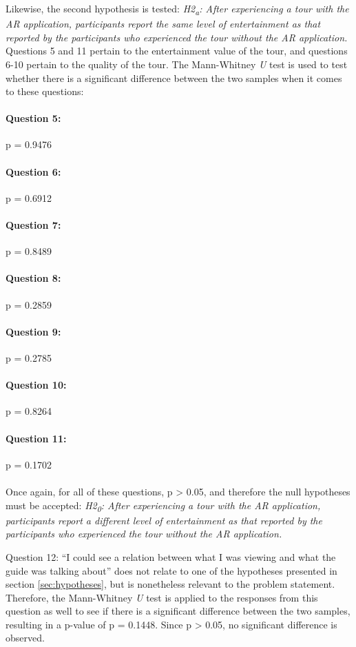 Likewise, the second hypothesis is tested: \textit{H2\textsubscript{a}: After experiencing a tour with the AR application, participants report the same level of entertainment as that reported by the participants who experienced the tour without the AR application.} Questions 5 and 11 pertain to the entertainment value of the tour, and questions 6-10 pertain to the quality of the tour. The Mann-Whitney \textit{U} test is used to test whether there is a significant difference between the two samples when it comes to these questions:

\paragraph{Question 5:} p = 0.9476
\paragraph{Question 6:} p = 0.6912
\paragraph{Question 7:} p = 0.8489
\paragraph{Question 8:} p = 0.2859
\paragraph{Question 9:} p = 0.2785
\paragraph{Question 10:} p = 0.8264
\paragraph{Question 11:} p = 0.1702\\
\\
Once again, for all of these questions, p > 0.05, and therefore the null hypotheses must be accepted: \textit{H2\textsubscript{0}: After experiencing a tour with the AR application, participants report a different level of entertainment as that reported by the participants who experienced the tour without the AR application.}

Question 12: “I could see a relation between what I was viewing and what the guide was talking about” does not relate to one of the hypotheses presented in section \ref{sec:hypotheses}, but is nonetheless relevant to the problem statement. Therefore, the Mann-Whitney \textit{U} test is applied to the responses from this question as well to see if there is a significant difference between the two samples, resulting in a p-value of p = 0.1448. Since p > 0.05, no significant difference is observed. 

